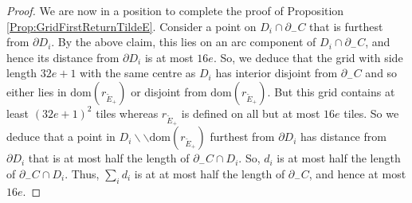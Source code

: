 \documentclass[oneside]{amsart}
\numberwithin{equation}{section}
\theoremstyle{plain}
\theoremstyle{definition}
\newcommand{\cut}{\backslash\backslash}
\begin{document}
\begin{proof}
We are now in a position to complete the proof of Proposition \ref{Prop:GridFirstReturnTildeE}.
Consider a point on $D_i \cap \partial_-C$ that is furthest from $\partial D_i$.
By the above claim, this lies on an arc component of $D_i \cap \partial_-C$, and hence
its distance from $\partial D_i$ is at most $16e$. So, we deduce that the grid with side length
$32e+1$ with the same centre as $D_i$
has interior disjoint from $\partial_-C$ and so either lies in $\mathrm{dom}(r_{\tilde E_+})$ or
disjoint from $\mathrm{dom}(r_{\tilde E_+})$. But this grid contains at least
$(32e+1)^2$ tiles whereas $r_{\tilde E_+}$ is defined on all but at most $16e$ tiles. 
So we deduce that a point in $D_i \cut \mathrm{dom}(r_{\tilde E_+})$ furthest
from $\partial D_i$ has distance from $\partial D_i$ that is at most half the length of
$\partial_- C \cap D_i$. So, $d_i$ is at most half the length of
$\partial_- C \cap D_i$. Thus, $\sum_i d_i$ is at at most half the length of
$\partial_- C$, and hence at most $16e$. 
\end{proof}
\end{document}
